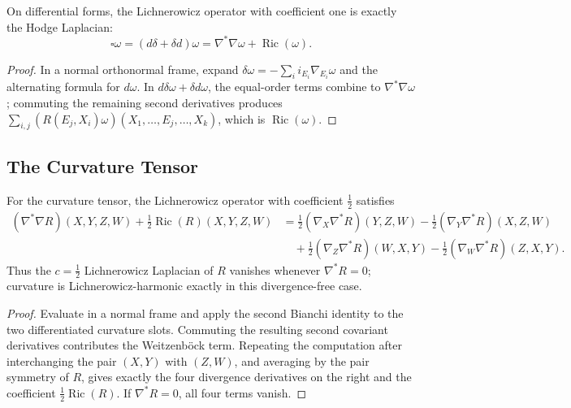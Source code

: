 \begin{theorem}
  \label{thm:pet-ch9-weitzenbock-hodge-laplacian}

  On differential forms, the Lichnerowicz operator with coefficient one is
  exactly the Hodge Laplacian:
  \[
    \square\omega=(d\delta+\delta d)\omega=\nabla^*\nabla\omega+\operatorname{Ric}(\omega).
  \]
\end{theorem}
\begin{proof}
  \sketch
  In a normal orthonormal frame, expand
  \(\delta\omega=-\sum_i i_{E_i}\nabla_{E_i}\omega\) and the alternating
  formula for \(d\omega\).  In \(d\delta\omega+\delta d\omega\), the equal-order
  terms combine to \(\nabla^*\nabla\omega\); commuting the remaining second
  derivatives produces
  \(\sum_{i,j}(R(E_j,X_i)\omega)(X_1,\ldots,E_j,\ldots,X_k)\), which is
  \(\operatorname{Ric}(\omega)\).
\end{proof}

\subsection{The Curvature Tensor}

\begin{theorem}
  \label{thm:pet-ch9-curvature-tensor-lichnerowicz}

  For the curvature tensor, the Lichnerowicz operator with coefficient
  $\tfrac12$ satisfies
  \begin{align*}
    (\nabla^*\nabla R)(X,Y,Z,W)+\tfrac12\operatorname{Ric}(R)(X,Y,Z,W)
    &=\tfrac12(\nabla_X\nabla^*R)(Y,Z,W)-\tfrac12(\nabla_Y\nabla^*R)(X,Z,W)\\
    &\quad+\tfrac12(\nabla_Z\nabla^*R)(W,X,Y)-\tfrac12(\nabla_W\nabla^*R)(Z,X,Y).
  \end{align*}
  Thus the $c=\tfrac12$ Lichnerowicz Laplacian of $R$ vanishes whenever
  $\nabla^*R=0$; curvature is Lichnerowicz-harmonic exactly in this
  divergence-free case.
\end{theorem}
\begin{proof}
  \sketch
  Evaluate in a normal frame and apply the second Bianchi identity to the two
  differentiated curvature slots.  Commuting the resulting second covariant
  derivatives contributes the Weitzenb\"ock term.  Repeating the computation
  after interchanging the pair \((X,Y)\) with \((Z,W)\), and averaging by the
  pair symmetry of \(R\), gives exactly the four divergence derivatives on
  the right and the coefficient \(\tfrac12\operatorname{Ric}(R)\).  If
  \(\nabla^*R=0\), all four terms vanish.
\end{proof}

